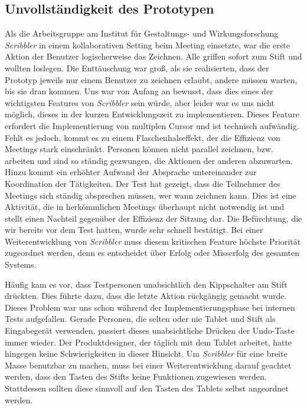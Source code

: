 \subsection{Unvollständigkeit des Prototypen}
Als die Arbeitsgruppe am Institut für Gestaltungs- und Wirkungsforschung \emph{Scribbler} in einem kollaborativen Setting beim Meeting einsetzte, war die erste Aktion der Benutzer logischerweise das Zeichnen. Alle griffen sofort zum Stift und wollten loslegen. Die Enttäuschung war groß, als sie realisierten, dass der Prototyp jeweils nur einem Benutzer zu zeichnen erlaubt, andere müssen warten, bis sie dran kommen. Uns war von Anfang an bewusst, dass dies eines der wichtigsten Features von \emph{Scribbler} sein würde, aber leider war es uns nicht möglich, dieses in der kurzen Entwicklungszeit zu implementieren. Dieses Feature erfordert die Implementierung von multiplen Cursor und ist technisch aufwändig. Fehlt es jedoch, kommt es zu einem Flaschenhalseffekt, der die Effizienz von Meetings stark einschränkt. Personen können nicht parallel zeichnen, bzw. arbeiten und sind so ständig gezwungen, die Aktionen der anderen abzuwarten. Hinzu kommt ein erhöhter Aufwand der Absprache untereinander zur Koordination der Tätigkeiten. Der Test hat gezeigt, dass die Teilnehmer des Meetings sich ständig absprechen müssen, wer wann zeichnen kann. Dies ist eine Aktivität, die in herkömmlichen Meetings überhaupt nicht notwendig ist und stellt einen Nachteil gegenüber der Effizienz der Sitzung dar. Die Befürchtung, die wir bereits vor dem Test hatten, wurde sehr schnell bestätigt. Bei einer Weiterentwicklung von \emph{Scribbler} muss diesem kritischen Feature höchste Priorität zugeordnet werden, denn es entscheidet über Erfolg oder Misserfolg des gesamten Systems.

\medskip Häufig kam es vor, dass Testpersonen unabsichtlich den Kippschalter am Stift drückten. Dies führte dazu, dass die letzte Aktion rückgängig gemacht wurde. Dieses Problem war uns schon während der Implementierungsphase bei internen Tests aufgefallen. Gerade Personen, die selten oder nie Tablet und Stift als Eingabegerät verwenden, passiert dieses unabsichtliche Drücken der Undo-Taste immer wieder. Der Produktdesigner, der täglich mit dem Tablet arbeitet, hatte hingegen keine Schwierigkeiten in dieser Hinsicht. Um \emph{Scribbler} für eine breite Masse benutzbar zu machen, muss bei einer Weiterentwicklung darauf geachtet werden, dass den Tasten des Stifts keine Funktionen zugewiesen werden. Stattdessen sollten diese sinnvoll auf den Tasten des Tablets selbst angeordnet werden.

